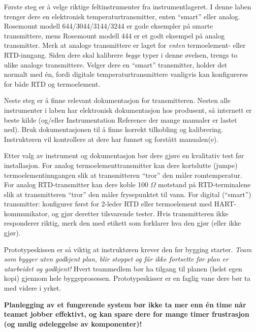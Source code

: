 \vskip 10pt

Første steg er å velge riktige feltinstrumenter fra instrumentlageret. I denne laben trenger dere en elektronisk temperaturtransmitter, enten ``smart'' eller analog. Rosemount modell 644/3044/3144/3244 er gode eksempler på smarte transmittere, mens Rosemount modell 444 er et godt eksempel på analog transmitter. Merk at analoge transmittere er laget for {\it enten} termoelement- eller RTD-inngang. Siden dere skal kalibrere {\it begge} typer i denne øvelsen, trengs to ulike analoge transmittere. Velger dere en ``smart'' transmitter, holder det normalt med én, fordi digitale temperaturtransmittere vanligvis kan konfigureres for både RTD og termoelement.

Neste steg er å finne relevant dokumentasjon for transmitteren. Nesten alle instrumenter i laben har elektronisk dokumentasjon hos produsent, så internett er beste kilde (og/eller Instrumentation Reference der mange manualer er lastet ned). Bruk dokumentasjonen til å finne korrekt tilkobling og kalibrering. Instruktøren vil kontrollere at dere har funnet og forstått manualen(e).

Etter valg av instrument og dokumentasjon bør dere gjøre en kvalitativ test før installasjon. For analog termoelementtransmitter kan dere kortslutte (jumpe) termoelementinngangen slik at transmitteren ``tror'' den måler romtemperatur. For analog RTD-transmitter kan dere koble 100 $\Omega$ motstand på RTD-terminalene slik at transmitteren ``tror'' den måler frysepunktet til vann. For digital (``smart'') transmitter: konfigurer først for 2-leder RTD eller termoelement med HART-kommunikator, og gjør deretter tilsvarende tester. Hvis transmitteren ikke responderer riktig, merk den med etikett som forklarer hva den gjør (eller ikke gjør).

\vskip 10pt

Prototypeskissen er så viktig at instruktøren krever den før bygging starter. {\it Team som bygger uten godkjent plan, blir stoppet og får ikke fortsette før plan er utarbeidet og godkjent!} Hvert teammedlem bør ha tilgang til planen (helst egen kopi) gjennom hele byggeprosessen. Prototypeskisser er en faglig vane dere bør ta med videre i yrket.

\vskip 10pt

{\bf Planlegging av et fungerende system bør ikke ta mer enn én time når teamet jobber effektivt, og kan spare dere for mange timer frustrasjon (og mulig ødeleggelse av komponenter)!}





